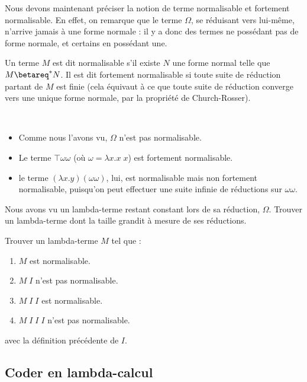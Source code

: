 Nous devons maintenant préciser la notion de terme normalisable et fortement normalisable. En effet, on remarque que le terme $\Omega$, se réduisant vers lui-même, n'arrive jamais à une forme normale : il y a donc des termes ne possédant pas de forme normale, et certains en possédant une.

\begin{defi}
    Un terme $M$ est dit normalisable s'il existe $N$ une forme normal telle que $M\betareq^* N$. Il est dit fortement normalisable si toute suite de réduction partant de $M$ est finie (cela équivaut à ce que toute suite de réduction converge vers une unique forme normale, par la propriété de Church-Rosser).
\end{defi}

\begin{expl}
    \ 
    \begin{itemize}[label=$\bullet$]
        \item Comme nous l'avons vu, $\Omega$ n'est pas normalisable.
        \item Le terme $\top \omega \omega$ (où $\omega = \lambda x.x\;x$) est fortement normalisable.
        \item le terme $(\lambda x. y)(\omega \omega)$, lui, est normalisable mais non fortement normalisable, puisqu'on peut effectuer une suite infinie de réductions sur $\omega \omega$.
    \end{itemize}
\end{expl}

\begin{exo}
    Nous avons vu un lambda-terme restant constant lors de sa réduction, $\Omega$. Trouver un lambda-terme dont la taille grandit à mesure de ses réductions.
\end{exo}

\begin{exo}[$*$]
    Trouver un lambda-terme $M$ tel que :
    \begin{enumerate}
        \item $M$ est normalisable.
        \item $M\; I$ n'est pas normalisable.
        \item $M\; I\; I$ est normalisable.
        \item $M\; I\; I\; I$ n'est pas normalisable.
    \end{enumerate}
    avec la définition précédente de $I$.
\end{exo}

\subsection{Coder en lambda-calcul}

